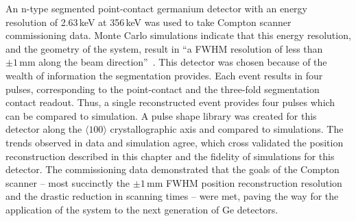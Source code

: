 An n-type segmented point-contact germanium detector with an energy resolution of 2.63\,keV at 356\,keV was used to take Compton scanner commissioning data. Monte Carlo simulations indicate that this energy resolution, and the geometry of the system, result in ``a FWHM resolution of less than $\pm1\,\text{mm}$ along the beam direction''~\cite{compton_scanner}. This detector was chosen because of the wealth of information the segmentation provides. Each event results in four pulses, corresponding to the point-contact and the three-fold segmentation contact readout. Thus, a single reconstructed event provides four pulses which can be compared to simulation. A pulse shape library was created for this detector along the $\langle100\rangle$ crystallographic axis and compared to \SSD{} simulations. The trends observed in data and simulation agree, which cross validated the position reconstruction described in this chapter and the fidelity of \SSD{} simulations for this detector. The commissioning data demonstrated that the goals of the Compton scanner -- most succinctly the $\pm1\,\text{mm}$ FWHM position reconstruction resolution and the drastic reduction in scanning times -- were met, paving the way for the application of the system to the next generation of Ge detectors. 